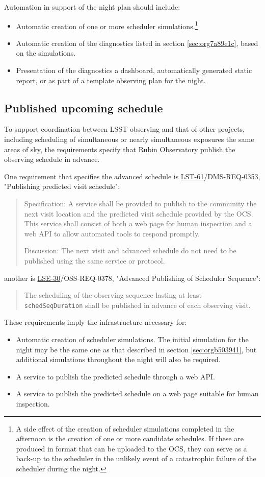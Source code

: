 Automation in support of the night plan should include:
\begin{itemize}
\item Automatic creation of one or more scheduler simulations.\footnote{A side effect of the creation of scheduler simulations completed in the afternoon is the creation of one or more candidate schedules. If these are produced in format that can be uploaded to the OCS, they can serve as a back-up to the scheduler in the unlikely event of a catastrophic failure of the scheduler during the night.}
\item Automatic creation of the diagnostics listed in section \ref{sec:org7a89e1c}, based on the simulations.
\item Presentation of the diagnostics a dashboard, automatically generated static report, or as part of a template observing plan for the night.
\end{itemize}

\subsection{Published upcoming schedule}
\label{sec:org9925ad2}
To support coordination between LSST observing and that of other projects, including scheduling of simultaneous or nearly simultaneous exposures the same areas of sky, the requirements specify that Rubin Observatory publish the observing schedule in advance.

One requirement that specifies the advanced schedule is \href{https://ls.st/lse-61}{LST-61}/DMS-REQ-0353, "Publishing predicted visit schedule":
\begin{quote}
Specification: A service shall be provided to publish to the community the next visit location and the predicted visit schedule provided by the OCS. This service shall consist of both a web page for human inspection and a web API to allow automated tools to respond promptly.

Discussion: The next visit and advanced schedule do not need to be published using the same service or protocol.
\end{quote}
another is \href{https://ls.st/lse-30}{LSE-30}/OSS-REQ-0378, "Advanced Publishing of Scheduler Sequence":
\begin{quote}
The scheduling of the observing sequence lasting at least \texttt{schedSeqDuration} shall be published in advance of each observing visit.
\end{quote}

These requirements imply the infrastructure necessary for:
\begin{itemize}
\item Automatic creation of scheduler simulations. The initial simulation for the night may be the same one as that described in section \ref{sec:orgb503941}, but additional simulations throughout the night will also be required.
\item A service to publish the predicted schedule through a web API.
\item A service to publish the predicted schedule on a web page suitable for human inspection.
\end{itemize}

